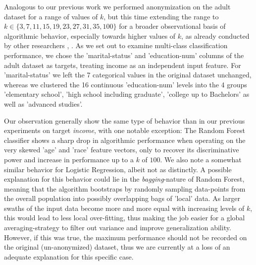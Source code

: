 \documentclass{llncs}
\begin{document}
Analogous to our previous work \cite{malle2016right} we performed anonymization on the adult dataset for a range of values of $k$, but this time extending the range to $k \in \{3, 7, 11, 15, 19, 23, 27, 31, 35, 100\}$ for a broader observational basis of algorithmic behavior, especially towards higher values of $k$, as already conducted by other researchers \cite{Majeed2017}, \cite{LeeHCeiling2017}. As we set out to examine multi-class classification performance, we chose the 'marital-status' and 'education-num' columns of the adult dataset as targets, treating income as an independent input feature. For 'marital-status' we left the 7 categorical values in the original dataset unchanged, whereas we clustered the 16 continuous 'education-num' levels into the 4 groups 'elementary school', 'high school including graduate', 'college up to Bachelors' as well as 'advanced studies'.

Our observation generally show the same type of behavior than in our previous experiments on target \textit{income}, with one notable exception: The Random Forest classifier shows a sharp drop in algorithmic performance when operating on the very skewed 'age' and 'race' feature vectors, only to recover its discriminative power and increase in performance up to a $k$ of $100$. We also note a somewhat similar behavior for Logistic Regression, albeit not as distinctly. A possible explanation for this behavior could lie in the \textit{bagging}-nature of Random Forest, meaning that the algorithm bootstraps by randomly sampling data-points from the overall population into possibly overlapping bags of 'local' data. As larger swaths of the input data become more and more equal with increasing levels of $k$, this would lead to less local over-fitting, thus making the job easier for a global averaging-strategy to filter out variance and improve generalization ability. However, if this was true, the maximum performance should not be recorded on the original (un-anonymized) dataset, thus we are currently at a loss of an adequate explanation for this specific case.
\end{document}
